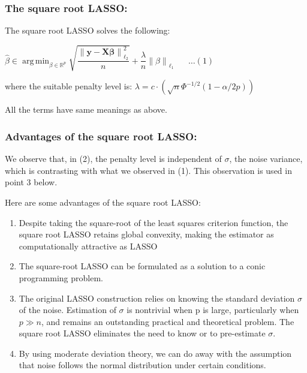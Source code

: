 \documentclass[fleqn, 11pt]{article}
\DeclareMathOperator*{\argmin}{arg\,min}
\newcommand{\bs}[1]{\boldsymbol{#1}}
\newcommand\norm[1]{\left\lVert#1\right\rVert}
\begin{document}
\subsubsection*{The square root LASSO:}

The square root LASSO solves the following: 

\begin{center}
    
$\hat{\beta} \in \displaystyle 
\argmin_{\beta \in \mathbb{R}^p} \sqrt{\dfrac{\norm{\bs{y-X \beta}}_{\ell_2}^2}{n}}
+ \dfrac{\lambda}{n} \norm{\beta}_{\ell_1}   \hspace{20pt}\ldots(1)   $

\end{center}

where the suitable penalty level is: $\lambda = c \cdot ( \sqrt{n} \Phi^{-1/2}(1-\alpha / 2p) ) $

All the terms have same meanings as above.

\subsubsection*{Advantages of the square root LASSO: }


We observe that, in (2), the penalty level is independent of $\sigma$, the noise variance, 
which is contrasting with what we observed in (1). This observation is used in point 3 below.

\medskip 

Here are some advantages of the square root LASSO:
\begin{enumerate}
    \item Despite taking the square-root of the least squares criterion function, the square root LASSO retains global convexity, making the estimator as computationally attractive as LASSO
    \item The square-root LASSO can be formulated as a solution to a conic programming problem.
    \item The original LASSO construction relies on knowing the standard deviation $\sigma$ of the noise. Estimation of $\sigma$  is nontrivial when p is large, particularly when $ p \gg n $, and remains an outstanding practical and theoretical problem. The square root LASSO eliminates the need to know or to pre-estimate $\sigma$. 
    \item By using moderate deviation theory, we can do away with the assumption that noise follows the normal distribution under certain conditions.
\end{enumerate}
\end{document}
